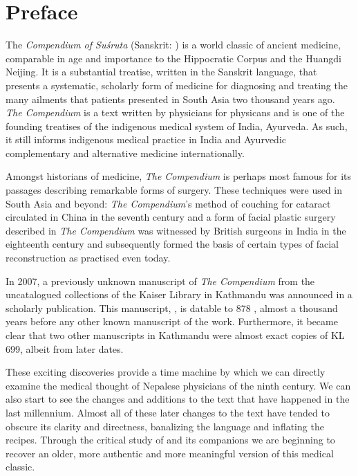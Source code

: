 \chapter*{Preface}

The \emph{Compendium of Suśruta} (Sanskrit: \SS) is a world classic of ancient
medicine, comparable in age and importance to the Hippocratic Corpus and the
Huangdi Neijing. It is a substantial treatise, written in the Sanskrit
language, that presents a systematic, scholarly form of medicine for
diagnosing and treating the many ailments that patients presented in South
Asia two thousand years ago. \emph{The Compendium} is a text written by
physicians for physicans and is one of the founding treatises of the
indigenous medical system of India, Ayurveda.  As such, it still informs
indigenous medical practice in India and Ayurvedic complementary and
alternative medicine internationally.

Amongst historians of medicine, \textit{The Compendium} is perhaps most famous
for its passages describing remarkable forms of surgery. These techniques were
used in South Asia and beyond: \emph{The Compendium}'s method of couching for
cataract circulated in China in the seventh century and a form of facial
plastic surgery described in \emph{The Compendium} was witnessed by British
surgeons in India in the eighteenth century and subsequently formed the basis
of certain types of facial reconstruction as practised even today.

In 2007, a previously unknown manuscript of \emph{The Compendium} from the
uncatalogued collections of the Kaiser Library in Kathmandu was announced in a
scholarly publication.  This manuscript, , is datable
to 878 \CE, almost a thousand years before any other known manuscript of the
work. Furthermore, it became clear that two other manuscripts in Kathmandu
were almost exact copies of KL 699, albeit from later dates.

These exciting discoveries provide a time machine by which we can directly
examine the medical thought of Nepalese physicians of the ninth century.  We
can also start to see the changes and additions to the text that have happened
in the last millennium.  Almost all of these later changes to the text have
tended to obscure its clarity and directness, banalizing the language and
inflating the recipes.  Through the critical study of   and its companions we are beginning to recover an older, more authentic
and more meaningful version of this medical classic.

